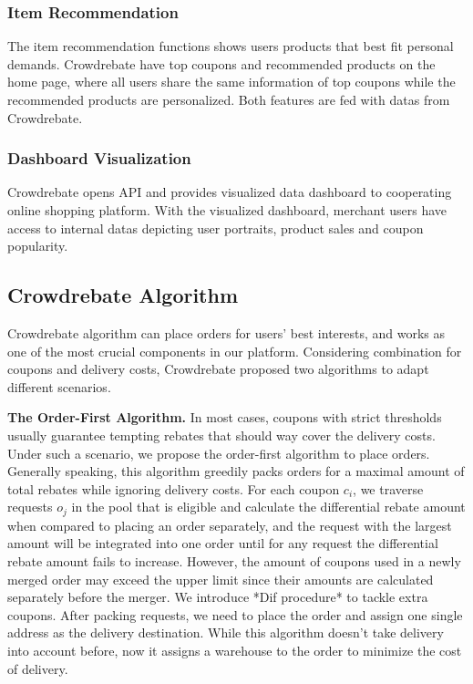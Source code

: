 \subsubsection{Item Recommendation}

The item recommendation functions shows users products that best fit personal demands. Crowdrebate  have top coupons and recommended products on the home page, where all users share the same information of top coupons while the recommended products are personalized. Both features are fed with datas from Crowdrebate.

\subsubsection{Dashboard Visualization}

Crowdrebate opens API and provides visualized data dashboard to cooperating online shopping platform. With the visualized dashboard, merchant users have access to internal datas depicting user portraits, product sales and coupon popularity.

\subsection{Crowdrebate Algorithm}

Crowdrebate algorithm can place orders for users' best interests, and works as one of the most crucial components in our platform. Considering combination for coupons and delivery costs, Crowdrebate proposed two algorithms to adapt different scenarios.

\textbf{The Order-First Algorithm.} In most cases, coupons with strict thresholds usually guarantee tempting rebates that should way cover the delivery costs. Under such a scenario, we propose the order-first algorithm to place orders. Generally speaking, this algorithm greedily packs orders for a maximal amount of total rebates while ignoring delivery costs. For each coupon $c_i$, we traverse requests $o_j$ in the pool that is eligible and calculate the differential rebate amount when compared to placing an order separately, and the request with the largest amount will be integrated into one order until for any request the differential rebate amount fails to increase. However, the amount of coupons used in a newly merged order may exceed the upper limit since their amounts are calculated separately before the merger. We introduce *Dif procedure* to tackle extra coupons. After packing requests, we need to place the order and assign one single address as the delivery destination. While this algorithm doesn't take delivery into account before, now it assigns a warehouse to the order to minimize the cost of delivery.

